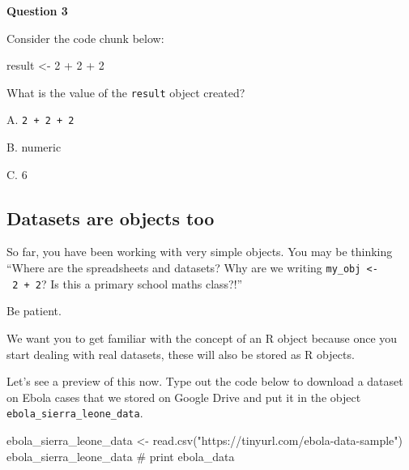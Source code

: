 \documentclass[
  letterpaper,
  DIV=11,
  numbers=noendperiod]{scrreprt}
\newenvironment{Shaded}{\begin{snugshade}}{\end{snugshade}}
\newcommand{\CommentTok}[1]{\textcolor[rgb]{0.37,0.37,0.37}{#1}}
\newcommand{\DecValTok}[1]{\textcolor[rgb]{0.68,0.00,0.00}{#1}}
\newcommand{\FunctionTok}[1]{\textcolor[rgb]{0.28,0.35,0.67}{#1}}
\newcommand{\NormalTok}[1]{\textcolor[rgb]{0.00,0.23,0.31}{#1}}
\newcommand{\OtherTok}[1]{\textcolor[rgb]{0.00,0.23,0.31}{#1}}
\newcommand{\SpecialCharTok}[1]{\textcolor[rgb]{0.37,0.37,0.37}{#1}}
\newcommand{\StringTok}[1]{\textcolor[rgb]{0.13,0.47,0.30}{#1}}
\begin{document}
\begin{tcolorbox}[enhanced jigsaw, title=\textcolor{quarto-callout-tip-color}{\faLightbulb}\hspace{0.5em}{Practice}, colbacktitle=quarto-callout-tip-color!10!white, leftrule=.75mm, arc=.35mm, opacityback=0, bottomrule=.15mm, rightrule=.15mm, toptitle=1mm, breakable, toprule=.15mm, colback=white, coltitle=black, colframe=quarto-callout-tip-color-frame, bottomtitle=1mm, titlerule=0mm, left=2mm, opacitybacktitle=0.6]

\textbf{Question 3}

Consider the code chunk below:

\begin{Shaded}
\begin{Highlighting}[]
\NormalTok{result }\OtherTok{\textless{}{-}}  \DecValTok{2} \SpecialCharTok{+} \DecValTok{2} \SpecialCharTok{+} \DecValTok{2}
\end{Highlighting}
\end{Shaded}

What is the value of the \texttt{result} object created?

A. \texttt{2\ +\ 2\ +\ 2}

B. numeric

C. 6

\end{tcolorbox}

\subsection{Datasets are objects too}\label{datasets-are-objects-too}

So far, you have been working with very simple objects. You may be
thinking ``Where are the spreadsheets and datasets? Why are we writing
\texttt{my\_obj\ \textless{}-\ 2\ +\ 2}? Is this a primary school maths
class?!''

Be patient.

We want you to get familiar with the concept of an R object because once
you start dealing with real datasets, these will also be stored as R
objects.

Let's see a preview of this now. Type out the code below to download a
dataset on Ebola cases that we stored on Google Drive and put it in the
object \texttt{ebola\_sierra\_leone\_data}.

\begin{Shaded}
\begin{Highlighting}[]
\NormalTok{ebola\_sierra\_leone\_data }\OtherTok{\textless{}{-}} \FunctionTok{read.csv}\NormalTok{(}\StringTok{"https://tinyurl.com/ebola{-}data{-}sample"}\NormalTok{)}
\NormalTok{ebola\_sierra\_leone\_data }\CommentTok{\# print ebola\_data}
\end{Highlighting}
\end{Shaded}
\end{document}
